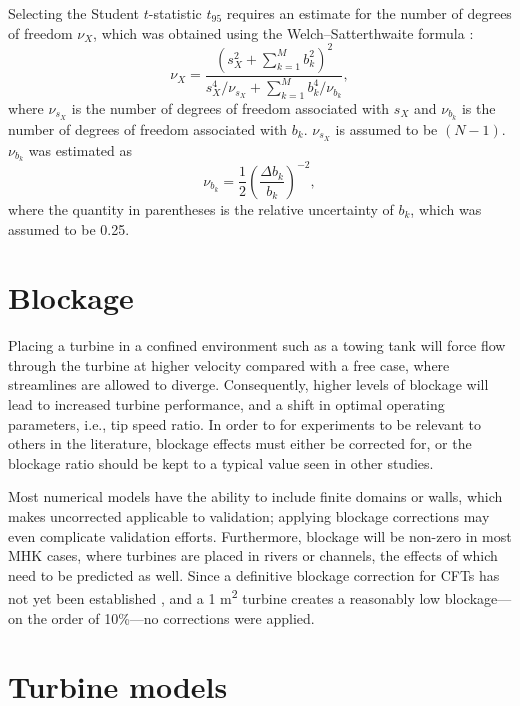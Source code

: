 Selecting the Student $t$-statistic $t_{95}$ requires an estimate for the number
of degrees of freedom $\nu_X$, which was obtained using the Welch--Satterthwaite
formula \cite{ColemanSteele}:
\begin{equation}
    \nu_X = \frac{\left(s_X^2 + \sum_{k=1}^M b_k^2 \right)^2} {s_X^4/\nu_{s_X} +
    \sum_{k=1}^M b_k^4/\nu_{b_k}},
\end{equation}
where $\nu_{s_X}$ is the number of degrees of freedom associated with $s_X$ and
$\nu_{b_k}$ is the number of degrees of freedom associated with $b_k$.
$\nu_{s_X}$ is assumed to be $(N-1)$. $\nu_{b_k}$ was estimated as
\begin{equation}
    \nu_{b_k} = \frac{1}{2} \left( \frac{\Delta b_k}{b_k} \right)^{-2},
\end{equation}
where the quantity in parentheses is the relative uncertainty of $b_k$, which
was assumed to be 0.25.


\section{Blockage}

Placing a turbine in a confined environment such as a towing tank will force
flow through the turbine at higher velocity compared with a free case, where
streamlines are allowed to diverge. Consequently, higher levels of blockage will
lead to increased turbine performance, and a shift in optimal operating
parameters, i.e., tip speed ratio. In order to for experiments to be relevant to
others in the literature, blockage effects must either be corrected for, or the
blockage ratio should be kept to a typical value seen in other studies.

Most numerical models have the ability to include finite domains or walls, which
makes uncorrected applicable to validation; applying blockage corrections may
even complicate validation efforts. Furthermore, blockage will be non-zero in
most MHK cases, where turbines are placed in rivers or channels, the effects of
which need to be predicted as well. Since a definitive blockage correction for
CFTs has not yet been established \cite{Cavagnaro2014, Dossena2015}, and a 1
m\textsuperscript{2} turbine creates a reasonably low blockage---on the order of
10\%---no corrections were applied.


\section{Turbine models}

